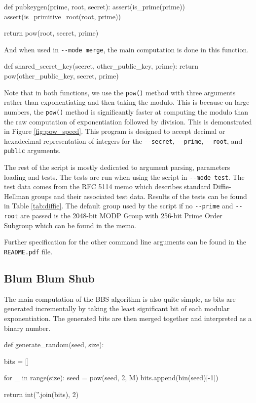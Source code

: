 \documentclass{article}
\begin{document}
\bigskip
\begin{python}
def pubkeygen(prime, root, secret):
    assert(is_prime(prime))
    assert(is_primitive_root(root, prime))

    return pow(root, secret, prime)
\end{python}
\bigskip

And when used in \verb+--mode merge+, the main computation is done in this function.

\bigskip
\begin{python}
def shared_secret_key(secret, other_public_key, prime):
    return pow(other_public_key, secret, prime)
\end{python}
\bigskip

Note that in both functions, we use the \verb+pow()+ method with three arguments rather than exponentiating and then taking the modulo. This is because on large numbers, the \verb+pow()+ method is significantly faster at computing the modulo than the raw computation of exponentiation followed by division. This is demonstrated in Figure \ref{fig:pow_speed}. 
This program is designed to accept decimal or hexadecimal representation of integers for the \verb+--secret+, \verb+--prime+, \verb+--root+, and \verb+--public+ arguments.

The rest of the script is mostly dedicated to argument parsing, parameters loading and tests. The tests are run when using the script in \verb+--mode test+. The test data comes from the RFC 5114\cite{rfc5114} memo which describes standard Diffie-Hellman groups and their associated test data. Results of the tests can be found in Table \ref{tab:diffie}. The default group used by the script if no \verb+--prime+ and \verb+--root+ are passed is the 2048-bit MODP Group with 256-bit Prime Order Subgroup which can be found in the memo. 

Further specification for the other command line arguments can be found in the \verb+README.pdf+ file.

\subsection{Blum Blum Shub}

The main computation of the BBS algorithm is also quite simple, as bits are generated incrementally by taking the least significant bit of each modular exponentiation. The generated bits are then merged together and interpreted as a binary number.

\bigskip
\begin{python}
def generate_random(seed, size):

    bits = []

    for _ in range(size):
        seed = pow(seed, 2, M)
        bits.append(bin(seed)[-1])
    
    return int(''.join(bits), 2)
\end{python}
\bigskip
\end{document}
